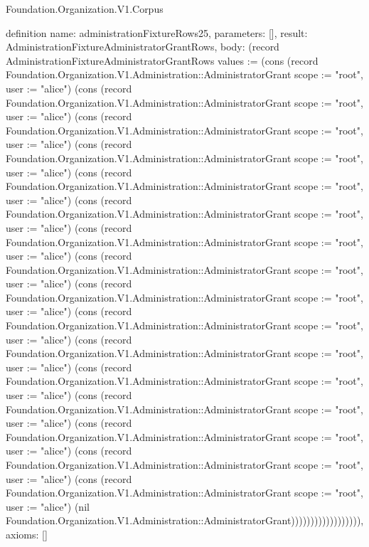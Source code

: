 \begin{lexlean}{Foundation.Organization.V1.Corpus}
\begin{semanticmodule}
definition{
  name: administrationFixtureRows25,
  parameters: [],
  result: AdministrationFixtureAdministratorGrantRows,
  body: (record AdministrationFixtureAdministratorGrantRows {values := (cons (record Foundation.Organization.V1.Administration::AdministratorGrant {scope := "root", user := "alice"}) (cons (record Foundation.Organization.V1.Administration::AdministratorGrant {scope := "root", user := "alice"}) (cons (record Foundation.Organization.V1.Administration::AdministratorGrant {scope := "root", user := "alice"}) (cons (record Foundation.Organization.V1.Administration::AdministratorGrant {scope := "root", user := "alice"}) (cons (record Foundation.Organization.V1.Administration::AdministratorGrant {scope := "root", user := "alice"}) (cons (record Foundation.Organization.V1.Administration::AdministratorGrant {scope := "root", user := "alice"}) (cons (record Foundation.Organization.V1.Administration::AdministratorGrant {scope := "root", user := "alice"}) (cons (record Foundation.Organization.V1.Administration::AdministratorGrant {scope := "root", user := "alice"}) (cons (record Foundation.Organization.V1.Administration::AdministratorGrant {scope := "root", user := "alice"}) (cons (record Foundation.Organization.V1.Administration::AdministratorGrant {scope := "root", user := "alice"}) (cons (record Foundation.Organization.V1.Administration::AdministratorGrant {scope := "root", user := "alice"}) (cons (record Foundation.Organization.V1.Administration::AdministratorGrant {scope := "root", user := "alice"}) (cons (record Foundation.Organization.V1.Administration::AdministratorGrant {scope := "root", user := "alice"}) (cons (record Foundation.Organization.V1.Administration::AdministratorGrant {scope := "root", user := "alice"}) (cons (record Foundation.Organization.V1.Administration::AdministratorGrant {scope := "root", user := "alice"}) (cons (record Foundation.Organization.V1.Administration::AdministratorGrant {scope := "root", user := "alice"}) (nil Foundation.Organization.V1.Administration::AdministratorGrant)))))))))))))))))}),
  axioms: []
}


\end{semanticmodule}
\end{lexlean}
